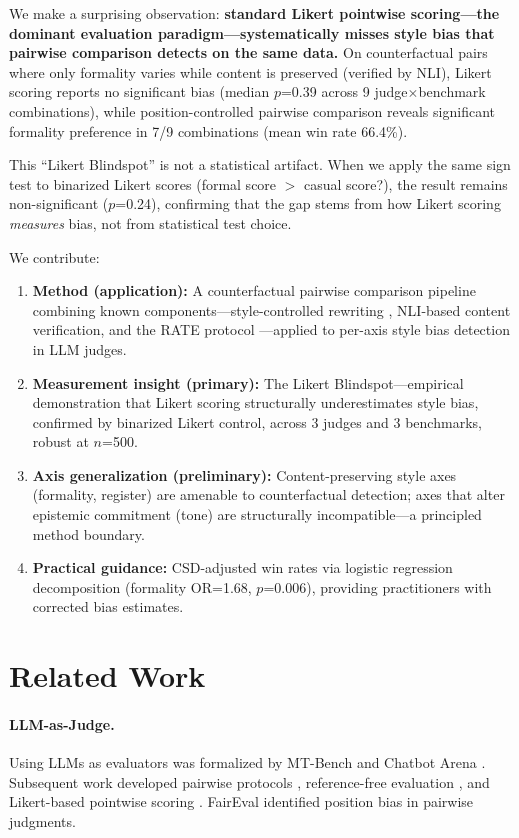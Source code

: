 \documentclass[11pt,a4paper]{article}
\begin{document}
We make a surprising observation: \textbf{standard Likert pointwise scoring---the dominant evaluation paradigm---systematically misses style bias that pairwise comparison detects on the same data.}
On counterfactual pairs where only formality varies while content is preserved (verified by NLI), Likert scoring reports no significant bias (median $p$=0.39 across 9 judge$\times$benchmark combinations), while position-controlled pairwise comparison reveals significant formality preference in 7/9 combinations (mean win rate 66.4\%).

This ``Likert Blindspot'' is not a statistical artifact.
When we apply the same sign test to binarized Likert scores (formal score $>$ casual score?), the result remains non-significant ($p$=0.24), confirming that the gap stems from how Likert scoring \emph{measures} bias, not from statistical test choice.

We contribute:
\begin{enumerate}[nosep,leftmargin=*]
\item \textbf{Method (application):} A counterfactual pairwise comparison pipeline combining known components---style-controlled rewriting \citep{mir2019evaluating,krishna2020reformulating}, NLI-based content verification, and the RATE protocol \citep{feuer2025rate}---applied to per-axis style bias detection in LLM judges.
\item \textbf{Measurement insight (primary):} The Likert Blindspot---empirical demonstration that Likert scoring structurally underestimates style bias, confirmed by binarized Likert control, across 3 judges and 3 benchmarks, robust at $n$=500.
\item \textbf{Axis generalization (preliminary):} Content-preserving style axes (formality, register) are amenable to counterfactual detection; axes that alter epistemic commitment (tone) are structurally incompatible---a principled method boundary.
\item \textbf{Practical guidance:} CSD-adjusted win rates via logistic regression decomposition (formality OR=1.68, $p$=0.006), providing practitioners with corrected bias estimates.
\end{enumerate}

\section{Related Work}

\paragraph{LLM-as-Judge.}
Using LLMs as evaluators was formalized by MT-Bench and Chatbot Arena \citep{zheng2023judging}.
Subsequent work developed pairwise protocols \citep{li2024crowdsourced}, reference-free evaluation \citep{wang2023chatgpt}, and Likert-based pointwise scoring \citep{liu2023geval}.
FairEval \citep{wang2024faireval} identified position bias in pairwise judgments.
\end{document}
